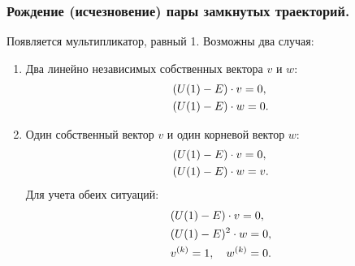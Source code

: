 	\subsubsection{Рождение (исчезновение) пары замкнутых траекторий.}
	\vspace{-0.5em}
	Появляется мультипликатор, равный 1. Возможны два случая:
	\begin{enumerate}[leftmargin=1.4em] %
		\item Два линейно независимых собственных вектора \(v\) и \(w\):
		\vspace{-0.5em}
		\begin{equation}
			\begin{aligned}
				&(U(1) - E) \cdot v = 0, \\
				&(U(1) - E) \cdot w = 0.
			\end{aligned}
			\vspace{-0.5em}
		\end{equation}
		\item Один собственный вектор \(v\) и один корневой вектор \(w\):
		\vspace{-0.5em}
		\begin{equation}
			\begin{aligned}
				&(U(1) - E) \cdot v = 0, \\
				&(U(1) - E) \cdot w = v.
			\end{aligned}
			\vspace{-0.5em}
		\end{equation}
		Для учета обеих ситуаций:
		\vspace{-0.25em}
		\begin{equation}
			\begin{aligned}
				&(U(1) - E) \cdot v = 0, \\
				&(U(1) - E)^2 \cdot w = 0, \\
				&v^{(k)} = 1, \quad w^{(k)} = 0.
			\end{aligned}
			\vspace{-0.5em}
		\end{equation}
	\end{enumerate}
	\vspace{-1.75em}
